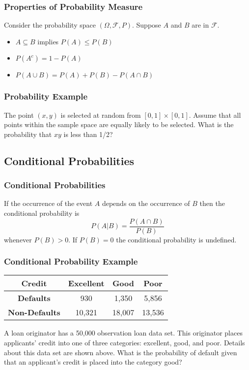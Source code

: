 \documentclass{beamer}
\begin{document}
\begin{frame}
\frametitle{Properties of Probability Measure}
Consider the probability space $(\Omega, \mathcal{F}, P)$. Suppose $A$ and $B$ are in $\mathcal{F}$.
\begin{itemize}
\item $A \subseteq B$ implies $P(A) \leq P(B)$
\item $P(A^c) = 1 - P(A)$
\item $P(A\cup B) = P(A) + P(B) - P(A\cap B)$
\end{itemize}
\end{frame}

\begin{frame}[t]
\frametitle{Probability Example}
\small
\begin{Example}
The point $(x, y)$ is selected at random from $[0, 1]\times [0, 1]$. Assume that all points within the sample space are equally likely to be selected. What is the probability that $xy$ is less than 1/2?
\end{Example}


\end{frame}

\subsection{Conditional Probabilities}

\begin{frame}
\frametitle{Conditional Probabilities}
\begin{Definition}
If the occurrence of the event $A$ depends on the occurrence of $B$ then the conditional probability is
$$
P(A | B) = \frac{P(A\cap B)}{P(B)}
$$
whenever $P(B) > 0$. If $P(B) = 0$ the conditional probability is undefined.
\end{Definition}

\end{frame}

\begin{frame}[t]
\frametitle{Conditional Probability Example}
\begin{center}
\tiny
\begin{tabular}{c | c c c}
\hline
{\bf Credit}		&	{\bf Excellent}	&	{\bf Good}	&	{\bf Poor}\\\hline
{\bf Defaults}		&	930			&	1,350	&	5,856\\
{\bf Non-Defaults}	&	10,321		&	18,007	&	13,536
\end{tabular}
\end{center}
\begin{Example}
\tiny
A loan originator has a 50,000 observation loan data set. This originator places applicants' credit into one of three categories: excellent, good, and poor. Details about this data set are shown above. What is the probability of default given that an applicant's credit is placed into the category good?
\end{Example}
\end{frame}
\end{document}

